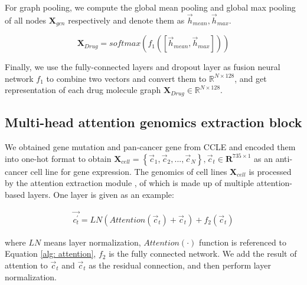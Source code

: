 \documentclass{article}
\begin{document}
For graph pooling, we compute the global mean pooling and global max pooling of all nodes $\mathbf{X}_{gcn}$  respectively  and denote them as $\vec{h}_{mean},\vec{h}_{max}$.

\begin{equation}
       \mathbf{X}_{Drug} = softmax(f_1(\left [ \vec{h}_{mean},\vec{h}_{max} \right ]))
\end{equation}


Finally, we use the fully-connected layers and dropout layer as fusion neural network $f_1$ to combine two vectors and convert them to $ \mathbb{R}^{ N \times 128} $, and get representation of each drug molecule graph $\mathbf{X}_{Drug} \in \mathbb{R}^{ N \times 128}$.

























\subsection{ Multi-head attention genomics extraction block}

We obtained gene mutation and pan-cancer gene from CCLE \cite{CCLE} and  encoded them into one-hot format to obtain  $ \mathbf{X}_{cell} = \left \{ \vec{c}_1,\vec{c}_2,...,\vec{c}_N \right \}, \vec{c}_t \in \mathbf{R}^{735 \times 1} $ as an anti-cancer cell line for gene expression.
 The genomics of cell lines $\mathbf{X}_{cell}$ is processed by the attention extraction module
, of which is made up of multiple attention-based layers. One layer is given as an example:



\begin{align}
    \vec{c_t^{\prime}} =  LN \left( Attention( \vec{c}_t ) + \vec{c}_t \right)   + f_2(\vec{c}_t)
\end{align}

\noindent where $LN$ means layer normalization, $Attention(\cdot)$ function is referenced to Equation \ref{alg: attention}, $f_2$ is the fully connected network. We add the result of attention to $\vec{c}_t$ and $\vec{c}_t$ as the residual connection, and then perform layer normalization.
\end{document}
